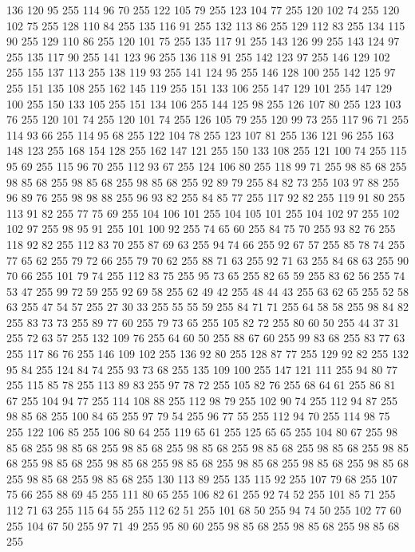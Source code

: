 136 120 95 255 114 96 70 255 122 105 79 255 123 104 77 255 120 102 74 255 120 102 75 255 128 110 84 255 135 116 91 255 132 113 86 255 129 112 83 255 134 115 90 255 129 110 86 255 120 101 75 255 135 117 91 255 143 126 99 255 143 124 97 255 135 117 90 255 141 123 96 255 136 118 91 255 142 123 97 255 146 129 102 255 155 137 113 255 138 119 93 255 141 124 95 255 146 128 100 255 142 125 97 255 151 135 108 255 162 145 119 255 151 133 106 255 147 129 101 255 147 129 100 255 150 133 105 255 151 134 106 255 144 125 98 255 126 107 80 255 123 103 76 255 120 101 74 255 120 101 74 255 126 105 79 255 120 99 73 255 117 96 71 255 114 93 66 255 114 95 68 255 122 104 78 255 123 107 81 255 136 121 96 255 163 148 123 255 168 154 128 255 162 147 121 255 150 133 108 255 121 100 74 255 115 95 69 255 115 96 70 255 112 93 67 255 124 106 80 255 118 99 71 255 98 85 68 255 98 85 68 255 98 85 68 255 98 85 68 255 92 89 79 255 84 82 73 255 103 97 88 255 96 89 76 255
98 98 88 255 96 93 82 255 84 85 77 255 117 92 82 255 119 91 80 255 113 91 82 255 77 75 69 255 104 106 101 255 104 105 101 255 104 102 97 255 102 102 97 255 98 95 91 255 101 100 92 255 74 65 60 255 84 75 70 255 93 82 76 255 118 92 82 255 112 83 70 255 87 69 63 255 94 74 66 255 92 67 57 255 85 78 74 255 77 65 62 255 79 72 66 255 79 70 62 255 88 71 63 255 92 71 63 255 84 68 63 255 90 70 66 255 101 79 74 255 112 83 75 255 95 73 65 255 82 65 59 255 83 62 56 255 74 53 47 255 99 72 59 255 92 69 58 255 62 49 42 255 48 44 43 255 63 62 65 255 52 58 63 255 47 54 57 255 27 30 33 255 55 55 59 255 84 71 71 255 64 58 58 255 98 84 82 255 83 73 73 255 89 77 60 255 79 73 65 255 105 82 72 255 80 60 50 255 44 37 31 255 72 63 57 255 132 109 76 255 64 60 50 255 88 67 60 255 99 83 68 255 83 77 63 255 117 86 76 255 146 109 102 255 136 92 80 255 128 87 77 255 129 92 82 255
132 95 84 255 124 84 74 255 93 73 68 255 135 109 100 255 147 121 111 255 94 80 77 255 115 85 78 255 113 89 83 255 97 78 72 255 105 82 76 255 68 64 61 255 86 81 67 255 104 94 77 255 114 108 88 255 112 98 79 255 102 90 74 255 112 94 87 255 98 85 68 255 100 84 65 255 97 79 54 255 96 77 55 255 112 94 70 255 114 98 75 255 122 106 85 255 106 80 64 255 119 65 61 255 125 65 65 255 104 80 67 255 98 85 68 255 98 85 68 255 98 85 68 255 98 85 68 255 98 85 68 255 98 85 68 255 98 85 68 255 98 85 68 255 98 85 68 255 98 85 68 255 98 85 68 255 98 85 68 255 98 85 68 255 98 85 68 255 98 85 68 255 130 113 89 255 135 115 92 255 107 79 68 255 107 75 66 255 88 69 45 255 111 80 65 255 106 82 61 255 92 74 52 255 101 85 71 255 112 71 63 255 115 64 55 255 112 62 51 255 101 68 50 255 94 74 50 255 102 77 60 255 104 67 50 255 97 71 49 255 95 80 60 255 98 85 68 255 98 85 68 255 98 85 68 255
